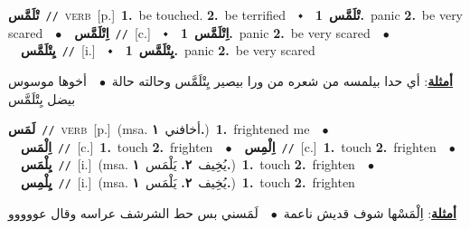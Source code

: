 \documentclass[10pt,a4paper,twoside]{article} %
\begin{document}
\begin{multicols}{2}
{\setlength\topsep{0pt}\textbf{\foreignlanguage{arabic}{تْلَمَّس}}\ {\color{gray}\texttt{//}\color{black}}\ \textsc{verb}\ [p.]\ \textbf{1.}~be touched.  \textbf{2.}~be terrified\ \ $\smblkdiamond$\ \ \setlength\topsep{0pt}\textbf{\foreignlanguage{arabic}{تْلَمَّس}}\ \textbf{1.}~panic  \textbf{2.}~be very scared\ \ $\bullet$\ \ \setlength\topsep{0pt}\textbf{\foreignlanguage{arabic}{اِتْلَمَّس}}\ {\color{gray}\texttt{//}\color{black}}\ [c.]\ \ $\smblkdiamond$\ \ \setlength\topsep{0pt}\textbf{\foreignlanguage{arabic}{اِتْلَمَّس}}\ \textbf{1.}~panic  \textbf{2.}~be very scared\ \ $\bullet$\ \ \setlength\topsep{0pt}\textbf{\foreignlanguage{arabic}{يِتْلَمَّس}}\ {\color{gray}\texttt{//}\color{black}}\ [i.]\ \ $\smblkdiamond$\ \ \setlength\topsep{0pt}\textbf{\foreignlanguage{arabic}{يِتْلَمَّس}}\ \textbf{1.}~panic  \textbf{2.}~be very scared\  \begin{flushright}\color{gray}\foreignlanguage{arabic}{\textbf{\underline{\foreignlanguage{arabic}{أمثلة}}}: أي حدا بيلمسه من شعره من ورا بيصير يِتْلَمَّس وحالته حالة\ $\bullet$\ \  أخوها موسوس بيضل يِتْلَمَّس}\end{flushright}\color{black}} \vspace{2mm}

{\setlength\topsep{0pt}\textbf{\foreignlanguage{arabic}{لَمَس}}\ {\color{gray}\texttt{//}\color{black}}\ \textsc{verb}\ [p.]\ \color{gray}(msa. \foreignlanguage{arabic}{أخافني}~\foreignlanguage{arabic}{\textbf{١.}})\color{black}\ \textbf{1.}~frightened me\ \ $\bullet$\ \ \setlength\topsep{0pt}\textbf{\foreignlanguage{arabic}{اِلْمَس}}\ {\color{gray}\texttt{//}\color{black}}\ [c.]\ \textbf{1.}~touch  \textbf{2.}~frighten\ \ $\bullet$\ \ \setlength\topsep{0pt}\textbf{\foreignlanguage{arabic}{اِلْمِس}}\ {\color{gray}\texttt{//}\color{black}}\ [c.]\ \textbf{1.}~touch  \textbf{2.}~frighten\ \ $\bullet$\ \ \setlength\topsep{0pt}\textbf{\foreignlanguage{arabic}{يِلْمَس}}\ {\color{gray}\texttt{//}\color{black}}\ [i.]\ \color{gray}(msa. \foreignlanguage{arabic}{يُخِيف}~\foreignlanguage{arabic}{\textbf{٢.}}  \foreignlanguage{arabic}{يَلْمَس}~\foreignlanguage{arabic}{\textbf{١.}})\color{black}\ \textbf{1.}~touch  \textbf{2.}~frighten\ \ $\bullet$\ \ \setlength\topsep{0pt}\textbf{\foreignlanguage{arabic}{يِلْمِس}}\ {\color{gray}\texttt{//}\color{black}}\ [i.]\ \color{gray}(msa. \foreignlanguage{arabic}{يُخِيف}~\foreignlanguage{arabic}{\textbf{٢.}}  \foreignlanguage{arabic}{يَلْمَس}~\foreignlanguage{arabic}{\textbf{١.}})\color{black}\ \textbf{1.}~touch  \textbf{2.}~frighten\  \begin{flushright}\color{gray}\foreignlanguage{arabic}{\textbf{\underline{\foreignlanguage{arabic}{أمثلة}}}: اِلْمَسْها شوف قديش ناعمة\ $\bullet$\ \  لَمَسني بس حط الشرشف عراسه وقال عووووو}\end{flushright}\color{black}} \vspace{2mm}


\end{multicols}
\end{document}

